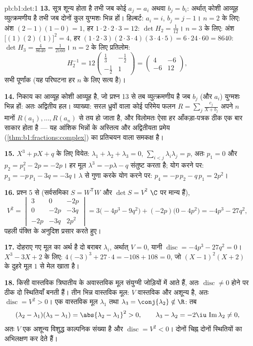 \begin{solution}{pb:b1:det:1}
\textbf{13.} सूत्र शून्य होता है तभी जब कोई $a_j = a_i$ अथवा $b_j = b_i$:
अर्थात् कोशी आव्यूह व्युत्क्रमणीय है तभी जब दोनों कुल युग्मशः भिन्न हों।
हिल्बर्ट: $a_i = i$, $b_j = j - 1$। $n = 2$ के लिए: अंश $(2-1)(1-0) = 1$, हर
$1\cdot2\cdot2\cdot3 = 12$: $\det H_2 = \frac1{12}$। $n = 3$ के लिए: अंश
$\bigl[(1)(2)(1)\bigr]^2 = 4$, हर $(1\cdot2\cdot3)
(2\cdot3\cdot4)(3\cdot4\cdot5) = 6\cdot24\cdot60 = 8640$: $\det H_3 =
\frac{4}{8640} = \frac1{2160}$। $n = 2$ के लिए प्रतिलोम:
\[
H_2^{-1} = 12\begin{pmatrix} \frac13 & -\frac12\\[2pt]
-\frac12 & 1\end{pmatrix}
= \begin{pmatrix} 4 & -6\\ -6 & 12 \end{pmatrix},
\]
सभी पूर्णांक (यह परिघटना हर $n$ के लिए सत्य है)।

\textbf{14.} निकाय का आव्यूह कोशी आव्यूह है, जो प्रश्न 13 से तब
व्युत्क्रमणीय है जब $b_j$ (और $a_i$) युग्मशः भिन्न हों: अतः अद्वितीय हल।
व्याख्या: सरल ध्रुवों वाला कोई परिमेय फलन $R = \sum_j \frac{c_j}{X + b_j}$
अपने $n$ मानों $R(a_1), \dots, R(a_n)$ से तय हो जाता है, और विलोमतः ऐसा हर
आँकड़ा-पत्रक ठीक एक बार साकार होता है --- यह आंशिक भिन्नों के अस्तित्व और
अद्वितीयता प्रमेय (\cref{thm:b1:fractions:complex}) का प्रतिचयन वाला समकक्ष
है।

\textbf{15.} $X^3 + pX + q$ के लिए वियेत: $\lambda_1 + \lambda_2 + \lambda_3
= 0$, $\sum_{i<j}\lambda_i\lambda_j = p$, अतः $p_1 = 0$ और $p_2 = p_1^2 - 2p
= -2p$। हर मूल $\lambda^3 = -p\lambda - q$ संतुष्ट करता है; योग करने पर:
$p_3 = -p\,p_1 - 3q = -3q$। $\lambda$ से गुणा करके योग करने पर: $p_4 =
-p\,p_2 - q\,p_1 = 2p^2$।

\textbf{16.} प्रश्न 5 से (सर्वसमिका $S = W^{\mathsf T}W$ और $\det S = V^2$
$\C$ पर मान्य हैं),
\[
V^2 = \begin{vmatrix}
3 & 0 & -2p\\
0 & -2p & -3q\\
-2p & -3q & 2p^2
\end{vmatrix}
= 3\bigl(-4p^3 - 9q^2\bigr) + (-2p)\bigl(0 - 4p^2\bigr)
= -4p^3 - 27q^2 ,
\]
पहली पंक्ति के अनुदिश प्रसार करते हुए।

\textbf{17.} दोहराए गए मूल का अर्थ है दो बराबर $\lambda_i$, अर्थात् $V = 0$,
यानी $\operatorname{disc} = -4p^3 - 27q^2 = 0$। $X^3 - 3X + 2$ के लिए:
$4(-3)^3 + 27\cdot4 = -108 + 108 = 0$, जो $(X-1)^2(X+2)$ के दुहरे मूल $1$ से
मेल खाता है।

\textbf{18.} किसी वास्तविक त्रिघातीय के अवास्तविक मूल संयुग्मी जोड़ियों में
आते हैं, अतः $\operatorname{disc} \neq 0$ होने पर ठीक दो स्थितियाँ बनती हैं।
तीन भिन्न वास्तविक मूल: $V$ वास्तविक और अशून्य है, अतः $\operatorname{disc}
= V^2 > 0$। एक वास्तविक मूल $\lambda_1$ तथा $\lambda_3 = \conj{\lambda_2}
\notin \R$: तब
\[
(\lambda_2 - \lambda_1)(\lambda_3 - \lambda_1) =
\abs{\lambda_2 - \lambda_1}^2 > 0,
\qquad
\lambda_3 - \lambda_2 = -2\iu\,\operatorname{Im}\lambda_2 \neq 0,
\]
अतः $V$ एक अशून्य विशुद्ध काल्पनिक संख्या है और $\operatorname{disc} = V^2 <
0$। दोनों चिह्न दोनों स्थितियों का अभिलक्षण कर देते हैं।


\end{solution}
